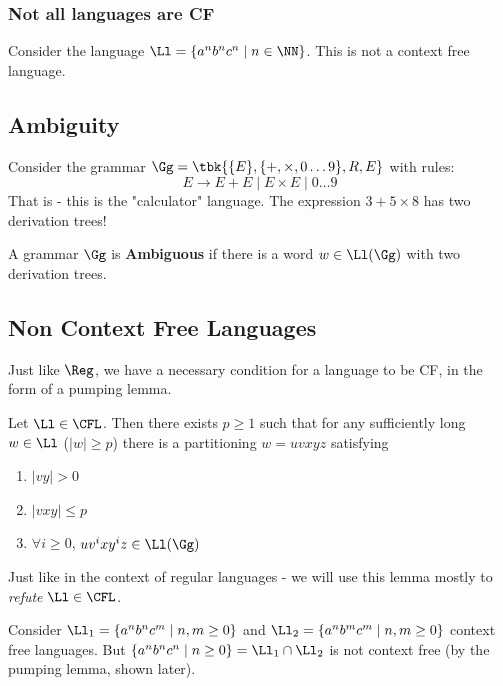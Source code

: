 \subsubsection*{Not all languages are CF}
\begin{example}
	Consider the language $\Ll = \{a^nb^nc^n\mid n\in \NN\}$. This is not a context free language.
\end{example}
\subsection{Ambiguity}
Consider the grammar $\Gg = \tbk{\{E\}, \{+,\times,0\ldots 9 \}, R,E}$ with rules:
\[
E\to E+E\mid E\times E \mid 0\ldots 9
\]
That is - this is the "calculator" language. The expression $3+5\times 8$ has two derivation trees!
\begin{yellowBox}
	\begin{defn}
		 A grammar $\Gg$ is \textbf{Ambiguous} if there is a word $w\in \Ll(\Gg)$ with two derivation trees.
	\end{defn}
\end{yellowBox}
\subsection{Non Context Free Languages}
Just like $\Reg$, we have a necessary condition for a language to be CF, in the form of a pumping lemma.
\begin{blueBox}
	\begin{thm}
		 Let $\Ll \in \CFL$. Then there exists $p  \geq 1$ such that for any sufficiently long $w\in \Ll$ ($|w| \geq p$) there is a partitioning $w = uvxyz$ satisfying
		\begin{enumerate}
			\item $|vy|>0$
			\item $|vxy|\leq p$
			\item $\forall i\geq 0$, $uv^ixy^iz\in \Ll(\Gg)$
		\end{enumerate}
	\end{thm}
\begin{remark}
	Just like in the context of regular languages - we will use this lemma mostly to \textit{refute} $\Ll\in \CFL$.
\end{remark}
\begin{example}
	Consider $\Ll_1 = \{a^nb^nc^m \mid n,m \geq 0\}$ and $\Ll_2 = \{a^nb^mc^m\mid n,m\geq 0\}$ context free languages. But $\{a^nb^nc^n\mid n\geq 0\} = \Ll_1\cap \Ll_2$ is not context free (by the pumping lemma, shown later).
\end{example}
\end{blueBox}

